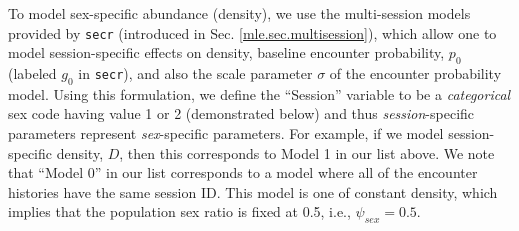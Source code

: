 To model sex-specific abundance (density), we  use the multi-session models  provided by
\mbox{\tt secr} (introduced in Sec. \ref{mle.sec.multisession}), which
allow one to model session-specific effects on density, baseline
encounter probability, $p_{0}$ (labeled $g_{0}$ in \mbox{\tt secr}), and also the scale
parameter $\sigma$ of the encounter probability model. Using this
formulation, we define the ``Session'' variable to be a {\it
  categorical} sex code having value 1 or 2 (demonstrated below) and
thus {\it session}-specific parameters represent {\it sex}-specific parameters.
For example, if we model session-specific density, $D$, then this
corresponds to Model 1 in our list above.  We note that ``Model 0'' in
our list corresponds to a model where all of the encounter
histories have the same session ID. This model is one of constant
density, which implies that the population sex ratio is fixed at 0.5, i.e.,
$\psi_{sex} = 0.5$. 

\begin{comment}

For fitting these models in {\bf BUGS} we use dummy variables. We
model  covariates on $p_{0}$ on
the logit-scale, and covariates on $\sigma$ on the
log-scale.
 Thus,  we will express  models allowing for sex-specificity
using a dummy variable \mbox{\tt Sex} and new parameters
($\alpha_{sex}$, $\beta_{sex}$) which
represent the {\it effect} of \mbox{\tt Sex} at level 1:
\[
 \mbox{logit}(p_{0,i}) = \alpha_{0} + \alpha_{sex} \mbox{\tt Sex}_{i}
\]
and
\[
 \mbox{log}(\sigma_{i}) = \log(\sigma_{0}) + \beta_{sex} \mbox{\tt Sex}_{i}
\]
In these expressions, the sex variable $\mbox{\tt Sex}_{i}$ is a
binary variable where $\mbox{\tt Sex}_{i}= 0$ corresponds to female,
and $\mbox{\tt Sex}_{i} = 1$ corresponds to male. 

\end{comment}

